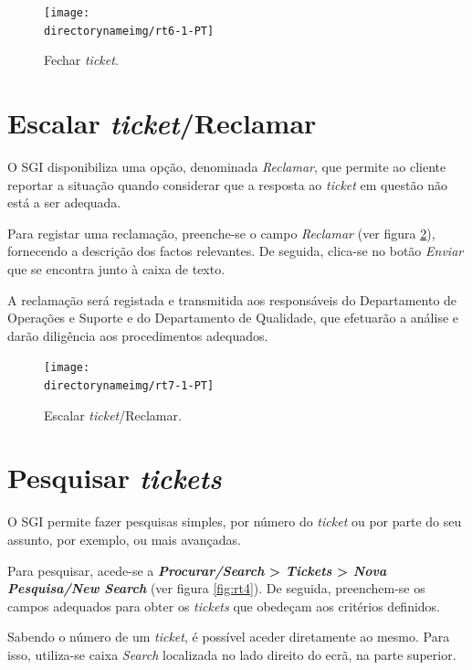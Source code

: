 \begin{figure}[H]
\begin{center}
\texttt{[image: \\directorynameimg/rt6-1-PT]}
\end{center}
\caption{Fechar \textit{ticket}.}
\label{fig:rt6}
\end{figure}

\section{Escalar \textit{ticket}/Reclamar} 
O SGI disponibiliza uma opção, denominada \emph{Reclamar}, que permite ao cliente reportar a situação quando considerar que a resposta ao \textit{ticket} em questão não está a ser adequada.

Para registar uma reclamação, preenche-se o campo \emph{Reclamar} (ver figura \ref{fig:rt7}), fornecendo a descrição dos factos relevantes. De seguida, clica-se no botão \emph{Enviar} que se encontra junto à caixa de texto.

A reclamação será registada e transmitida aos responsáveis do Departamento de Operações e Suporte e do Departamento de Qualidade, que efetuarão a análise e darão diligência aos procedimentos adequados.

\begin{figure}[H]
\begin{center}
\texttt{[image: \\directorynameimg/rt7-1-PT]}
\end{center}
\caption{Escalar \textit{ticket}/Reclamar.}
\label{fig:rt7}
\end{figure}


\section{Pesquisar \textit{tickets}}
O SGI permite fazer pesquisas simples, por número do \textit{ticket} ou por parte do seu assunto, por exemplo, ou mais avançadas.

Para pesquisar, acede-se a \textbf{\emph{Procurar/\textit{Search}} > \emph{\textit{Tickets}} > \emph{Nova Pesquisa/\textit{New Search}}} (ver figura \ref{fig:rt4}). De seguida, preenchem-se os campos adequados para obter os \emph{tickets} que obedeçam aos critérios definidos.

Sabendo o número de um \textit{ticket}, é possível aceder diretamente ao mesmo. 
Para isso, utiliza-se caixa \emph{\textit{Search}} localizada no lado direito do ecrã, na parte superior.

